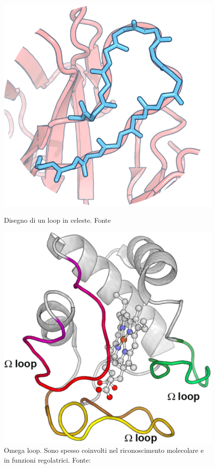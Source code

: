 {{\begin{figure}[!htb]
	\centering
	\includegraphics[scale= 1]{images/fread.png}
	\caption{Disegno di un loop in celeste. Fonte \cite{FREAD}}
	\label{fig:loop-example}
	\endminipage\hfill
	\centering
	\includegraphics[scale=0.3]{images/loops.png}
	\caption{Omega loop. Sono spesso coinvolti nel riconoscimento molecolare e in funzioni regolatrici. Fonte: \cite{Papaleo2016TheRO}}
	\label{fig:omega-loops}
	\endminipage\hfill
\end{figure}

}}
